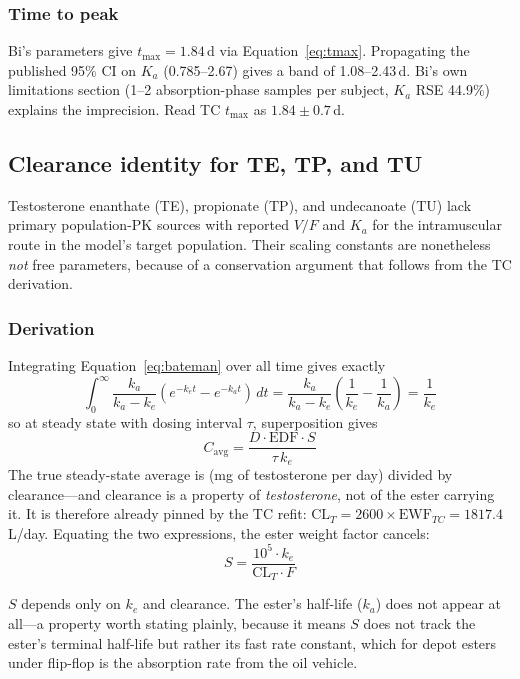 \documentclass[11pt,a4paper]{article}
\begin{document}
\subsubsection{Time to peak}

Bi's parameters give $t_{\max} = 1.84$\,d via Equation~\ref{eq:tmax}.
Propagating the published 95\% CI on $K_a$ (0.785--2.67) gives a band of
1.08--2.43\,d. Bi's own limitations section (1--2 absorption-phase
samples per subject, $K_a$ RSE 44.9\%) explains the imprecision. Read TC
$t_{\max}$ as $1.84 \pm 0.7$\,d.

\subsection{Clearance identity for TE, TP, and TU}
\label{sec:identity}

Testosterone enanthate (TE), propionate (TP), and undecanoate (TU) lack
primary population-PK sources with reported $V/F$ and $K_a$ for the
intramuscular route in the model's target population. Their scaling
constants are nonetheless \emph{not} free parameters, because of a
conservation argument that follows from the TC derivation.

\subsubsection{Derivation}

Integrating Equation~\ref{eq:bateman} over all time gives exactly
\[
\int_0^{\infty} \frac{k_a}{k_a-k_e}\left(e^{-k_e t}-e^{-k_a t}\right)\,dt
= \frac{k_a}{k_a-k_e}\left(\frac{1}{k_e}-\frac{1}{k_a}\right) = \frac{1}{k_e}
\]
so at steady state with dosing interval $\tau$, superposition gives
\begin{equation}
C_{\mathrm{avg}} = \frac{D \cdot \mathrm{EDF} \cdot S}{\tau \, k_e}
\label{eq:cavg}
\end{equation}
The true steady-state average is (mg of testosterone per day) divided by
clearance---and clearance is a property of \emph{testosterone}, not of
the ester carrying it. It is therefore already pinned by the TC refit:
$\mathrm{CL}_T = 2600 \times \mathrm{EWF}_{TC} = 1817.4$\,L/day.
Equating the two expressions, the ester weight factor cancels:
\begin{equation}
\boxed{\;S = \frac{10^5 \cdot k_e}{\mathrm{CL}_T \cdot F}\;}
\label{eq:identity}
\end{equation}

$S$ depends only on $k_e$ and clearance. The ester's half-life ($k_a$)
does not appear at all---a property worth stating plainly, because it
means $S$ does not track the ester's terminal half-life but rather its
fast rate constant, which for depot esters under flip-flop is the
absorption rate from the oil vehicle.
\end{document}
